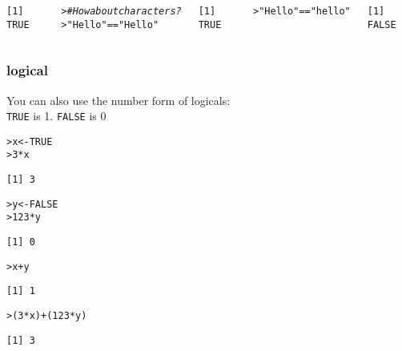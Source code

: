 \documentclass[13pt,aspectratio=169]{beamer}\usepackage[]{graphicx}\usepackage[]{color}
\makeatletter
\newcommand{\hlnum}[1]{\textcolor[rgb]{0.686,0.059,0.569}{#1}}%
\newcommand{\hlstr}[1]{\textcolor[rgb]{0.192,0.494,0.8}{#1}}%
\newcommand{\hlcom}[1]{\textcolor[rgb]{0.678,0.584,0.686}{\textit{#1}}}%
\newcommand{\hlopt}[1]{\textcolor[rgb]{0,0,0}{#1}}%
\newcommand{\hlstd}[1]{\textcolor[rgb]{0.345,0.345,0.345}{#1}}%
\newcommand{\hlkwb}[1]{\textcolor[rgb]{0.69,0.353,0.396}{#1}}%
\newenvironment{kframe}{%
 \def\at@end@of@kframe{}%
 \ifinner\ifhmode%
  \def\at@end@of@kframe{\end{minipage}}%
  \begin{minipage}{\columnwidth}%
 \fi\fi%
 \def\FrameCommand##1{\hskip\@totalleftmargin \hskip-\fboxsep
 \colorbox{shadecolor}{##1}\hskip-\fboxsep
     \hskip-\linewidth \hskip-\@totalleftmargin \hskip\columnwidth}%
 \MakeFramed {\advance\hsize-\width
   \@totalleftmargin\z@ \linewidth\hsize
   \@setminipage}}%
 {\par\unskip\endMakeFramed%
 \at@end@of@kframe}
\newenvironment{knitrout}{}{} %
\renewcommand{\tt}[1]{\texttt{#1}}
\renewenvironment{knitrout}{\setlength{\topsep}{0mm}}{}
\makeatother
\begin{document}
\begin{frame}[fragile]
\begin{columns}[t]
\begin{knitrout}
\begin{kframe}
\begin{alltt}
\end{alltt}
\begin{verbatim}
[1] TRUE
\end{verbatim}
\begin{alltt}
\hlstd{> }\hlcom{# How about characters?}
\hlstd{> }\hlstr{"Hello"} \hlopt{==} \hlstr{"Hello"}
\end{alltt}
\begin{verbatim}
[1] TRUE
\end{verbatim}
\begin{alltt}
\hlstd{> }\hlstr{"Hello"} \hlopt{==} \hlstr{"hello"}
\end{alltt}
\begin{verbatim}
[1] FALSE
\end{verbatim}
\end{kframe}
\end{knitrout}
    \end{columns}
\end{frame}

\begin{frame}[fragile]
    \frametitle{logical}
    \fontsize{14pt}{5}\selectfont
    \vskip16pt
    You can also use the number form of logicals:\\
    \vskip16pt
    \tt{TRUE} is 1. \tt{FALSE} is 0
    \vskip16pt

\begin{knitrout}\small
{}\color{fgcolor}\begin{kframe}
\begin{alltt}
\hlstd{> }\hlstd{x} \hlkwb{<-} \hlnum{TRUE}
\hlstd{> }\hlnum{3} \hlopt{*} \hlstd{x}
\end{alltt}
\begin{verbatim}
[1] 3
\end{verbatim}
\begin{alltt}
\hlstd{> }\hlstd{y} \hlkwb{<-} \hlnum{FALSE}
\hlstd{> }\hlnum{123} \hlopt{*} \hlstd{y}
\end{alltt}
\begin{verbatim}
[1] 0
\end{verbatim}
\begin{alltt}
\hlstd{> }\hlstd{x} \hlopt{+} \hlstd{y}
\end{alltt}
\begin{verbatim}
[1] 1
\end{verbatim}
\begin{alltt}
\hlstd{> }\hlstd{(}\hlnum{3} \hlopt{*} \hlstd{x)} \hlopt{+} \hlstd{(}\hlnum{123} \hlopt{*} \hlstd{y)}
\end{alltt}
\begin{verbatim}
[1] 3
\end{verbatim}
\end{kframe}
\end{knitrout}

\end{frame}
\end{document}
